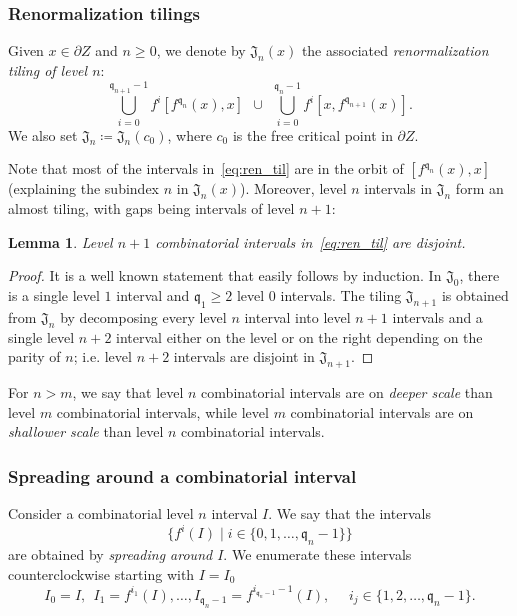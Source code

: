 \documentclass{amsart}
\renewcommand{\sp}{{\ \ }}
\newcommand{\1}{{\mathbb 1 }}
\newcommand\Jul{{\mathfrak J}}
\newcommand{\qq}{\mathfrak{q}}
\newcommand{\Jbb}{{\mathfrak{J}}}
\newtheorem{lem}[thm]{Lemma}
\theoremstyle{remark}
\numberwithin{equation}{section}
\theoremstyle{definition}
\begin{document}
\subsubsection{Renormalization tilings} \label{sss:renorm til}
Given $x\in \partial Z$ and $n\ge 0$, we denote by $\Jbb_n(x)$ the associated \emph{renormalization tiling of level $n$}:  
\begin{equation}
\label{eq:ren_til}
 \bigcup _{i=0}^{\qq_{n+1}-1} f^i [f^{\qq_n}(x),x] \sp\cup \sp \bigcup _{i=0}^{\qq_{n}-1} f^i [x,f^{\qq_{n+1}}(x)]. 
\end{equation}
We also set $\Jbb_n\coloneqq \Jbb_n(c_0)$, where $c_0$ is the free critical point in $\partial Z$. 

Note that most of the intervals in~\eqref{eq:ren_til} are in the orbit of $[f^{\qq_n}(x),x]$ (explaining the subindex $n$  in $\Jbb_n(x)$). Moreover, level $n$ intervals in $\Jbb_n$ form an almost tiling, with gaps being intervals of level $n+1$:
\begin{lem}
\label{lem:Jbb_n}
Level $n+1$ combinatorial intervals in~\eqref{eq:ren_til} are disjoint.  
\end{lem}
\begin{proof}
It is a well known statement that easily follows by induction. In $\Jul_0$, there is a single level $1$ interval and $\qq_1\ge 2$ level $0$ intervals. The tiling $\Jbb_{n+1}$ is obtained from $\Jbb_{n}$  by decomposing every level $n$ interval into level $n+1$ intervals and a single level $n+2$ interval either on the level or on the right depending on the parity of $n$; i.e. level $n+2$ intervals are disjoint in $\Jbb_{n+1}$.
\end{proof}


For $n>m$, we say that level $n$ combinatorial intervals are on \emph{deeper scale} than level $m$ combinatorial intervals, while level $m$ combinatorial intervals are on \emph{shallower scale} than level $n$ combinatorial intervals.

\subsubsection{Spreading around a combinatorial interval}\label{sss:spread around} Consider a combinatorial level $n$ interval $I$. We say that the intervals \[\{ f^{i}(I)\mid i\in \{0,1,\dots, \qq_n-1\}\}\] are obtained by \emph{spreading around $I$}. We enumerate these intervals counterclockwise starting with $I=I_0$
\begin{equation}
\label{eq:spred_around:I} I_0=I,\sp I_1=f^{i_1}(I), \dots, I_{\qq_n-1}=f^{i_{\qq_n-1}-1}(I),\sp\sp\sp i_j\in\{1,2,\dots,\qq_n-1\}.
\end{equation}
\end{document}
